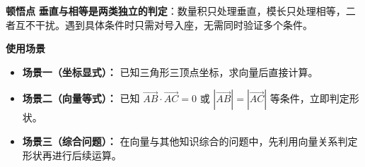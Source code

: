 \begin{explanationbox}
	\medskip
	\textbf{\textcolor{CExplanation}{顿悟点}}
	\textbf{垂直与相等是两类独立的判定}：数量积只处理垂直，模长只处理相等，二者互不干扰。遇到具体条件时只需对号入座，无需同时验证多个条件。

	\medskip
	\textbf{\textcolor{CExplanation}{使用场景}}
	\begin{itemize}[leftmargin=*, itemsep=0.5em, topsep=0.4em]
		\item \textbf{场景一（坐标显式）：} 已知三角形三顶点坐标，求向量后直接计算。
		\item \textbf{场景二（向量等式）：} 已知 $\overrightarrow{AB}\cdot\overrightarrow{AC}=0$ 或 $|\overrightarrow{AB}|=|\overrightarrow{AC}|$ 等条件，立即判定形状。
		\item \textbf{场景三（综合问题）：} 在向量与其他知识综合的问题中，先利用向量关系判定形状再进行后续运算。
	\end{itemize}

\end{explanationbox}
